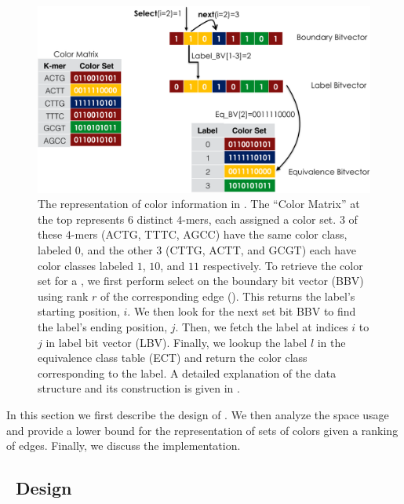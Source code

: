 \begin{figure}[t]
  \centering
  \includegraphics[width=\textwidth]{figs/cdbg-cropped}
  \caption{
    The representation of color information in \system. The ``Color Matrix'' at
    the top represents $6$ distinct $4$-mers, each assigned a color set. $3$ of
    these $4$-mers (ACTG, TTTC, AGCC) have the same color class, labeled $0$,
    and the other $3$ (CTTG, ACTT, and GCGT) each have color classes labeled
    $1$, $10$, and $11$ respectively. To retrieve the color set for a \kmer, we
    first perform select on the boundary bit vector (BBV) using rank $r$ of the
    corresponding edge (\kmer). This returns the label's starting position, $i$.
    We then look for the next set bit BBV to find the label's ending position,
    $j$. Then, we fetch the label at indices $i$ to $j$ in label bit vector
    (LBV). Finally, we lookup the label $l$ in the equivalence class table (ECT)
    and return the color class corresponding to the label. A detailed
    explanation of the data structure and its construction is given in
    .
  }
    \label{fig:cdbg-rep}
\end{figure}

In this section we first describe the design of \system. We then analyze the
space usage and provide a lower bound for the representation of sets of colors given
a ranking of \dbg edges. Finally, we discuss the \system implementation.

\subsection{~Design}
\label{design}

